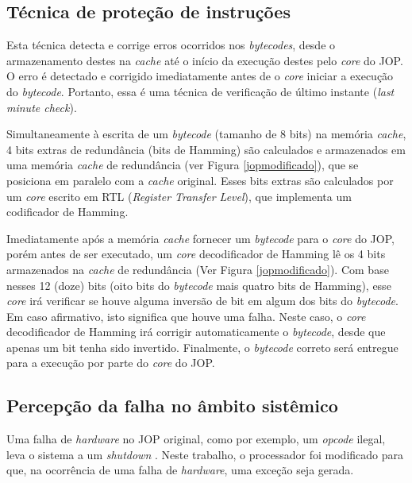 \documentclass[10pt,twocolumn]{article}
\begin{document}
\subsection{Técnica de proteção de instruções}
	Esta técnica detecta e corrige erros ocorridos nos \emph{bytecodes}, desde o armazenamento destes na \emph{cache} até o início da execução destes pelo \emph{core} do JOP. O erro é detectado e corrigido imediatamente antes de o \emph{core} iniciar a exe\-cu\-ção do \emph{bytecode}. Portanto, essa é uma técnica de verificação de último instante (\emph{last minute check})\cite{helanothesis}.
	
	Simultaneamente à escrita de um \emph{bytecode} (tamanho de 8 bits) na memória \emph{cache}, 4 bits extras de redundância (bits de Hamming) são calculados e armazenados em uma memória \emph{cache} de redundância (ver Figura \ref{jopmodificado}), que se posiciona em paralelo com a \emph{cache} original. Esses bits extras são calculados por um \emph{core} escrito em RTL (\emph{Register Transfer Level}), que implementa um codificador de Hamming.

	Imediatamente após a memória \emph{cache} fornecer um \emph{bytecode} para o \emph{core} do JOP, porém antes de ser executado, um \emph{core} decodificador de Hamming lê os 4 bits armazenados na \emph{cache} de redundância (Ver Figura \ref{jopmodificado}). Com base nesses 12 (doze) bits (oito bits do \emph{bytecode} mais quatro bits de Hamming), esse \emph{core} irá verificar se houve alguma inversão de bit em algum dos bits do \emph{bytecode}. Em caso afirmativo, isto significa que houve uma falha. Neste caso, o \emph{core} decodificador de Hamming irá corrigir automaticamente o \emph{bytecode}, desde que apenas um bit tenha sido invertido. Finalmente, o \emph{bytecode} correto será entregue para a execução por parte do \emph{core} do JOP.
	
\subsection{Percepção da falha no âmbito sistêmico}
	Uma falha de \emph{hardware} no JOP original, como por exemplo, um \emph{opcode} ilegal, leva o sistema a um \emph{shutdown} \cite{JopHandbook}. Neste trabalho, o processador foi modificado para que, na ocorrência de uma falha de \emph{hardware}, uma exceção seja gerada.

\end{document}

